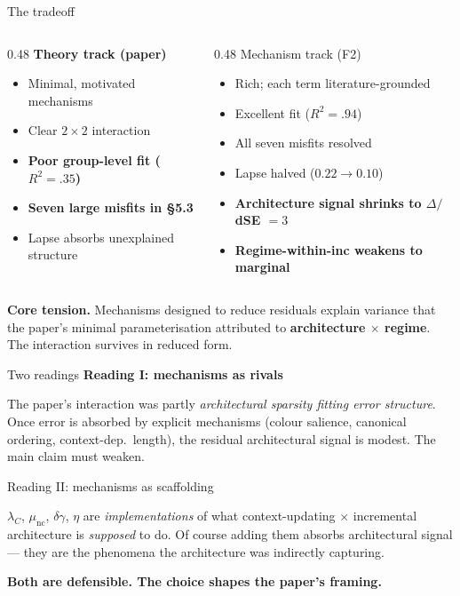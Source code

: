 \documentclass[10pt,aspectratio=169]{beamer}
\newcommand{\main}[1]{\textcolor{CSP-main-dark}{\textbf{#1}}}
\newcommand{\emp}[1]{\textcolor{CSP-emphasis}{\textbf{#1}}}
\newcommand{\accy}[1]{\textcolor{CSP-accent-2-dark}{#1}}      %
\begin{document}
\begin{frame}{The tradeoff}
\begin{columns}[t]
\begin{column}{0.48\textwidth}
\main{Theory track (paper)}
\begin{itemize}\itemsep0.2em
  \item Minimal, motivated mechanisms
  \item Clear $2\!\times\!2$ interaction
  \item \emp{Poor group-level fit ($R^2 = .35$)}
  \item \emp{Seven large misfits in \S5.3}
  \item Lapse absorbs unexplained structure
\end{itemize}
\end{column}

\begin{column}{0.48\textwidth}
\accy{Mechanism track (F2)}
\begin{itemize}\itemsep0.2em
  \item Rich; each term literature-grounded
  \item Excellent fit ($R^2 = .94$)
  \item All seven misfits resolved
  \item Lapse halved ($0.22 \to 0.10$)
  \item \emp{Architecture signal shrinks to $\Delta/$dSE $= 3$}
  \item \emp{Regime-within-inc weakens to marginal}
\end{itemize}
\end{column}
\end{columns}

\vspace{1em}
\main{Core tension.} Mechanisms designed to reduce residuals explain variance that the paper's minimal parameterisation attributed to \emp{architecture $\times$ regime}. The interaction survives in reduced form.
\end{frame}

\begin{frame}{Two readings}
\small
\main{Reading I: mechanisms as rivals}

The paper's interaction was partly \emph{architectural sparsity fitting error structure}. Once error is absorbed by explicit mechanisms (colour salience, canonical ordering, context-dep.\ length), the residual architectural signal is modest. The main claim must weaken.

\vspace{1em}
\accy{Reading II: mechanisms as scaffolding}

$\lambda_C$, $\mu_\mathrm{nc}$, $\delta\gamma$, $\eta$ are \emph{implementations} of what context-updating $\times$ incremental architecture is \emph{supposed} to do. Of course adding them absorbs architectural signal --- they are the phenomena the architecture was indirectly capturing.

\vspace{1em}
\emp{Both are defensible. The choice shapes the paper's framing.}
\end{frame}
\end{document}
